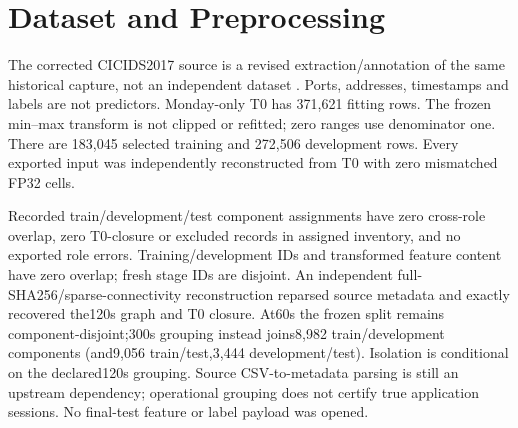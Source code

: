 \documentclass[10pt,a4paper]{article}
\begin{document}
\section{Dataset and Preprocessing}
The corrected CICIDS2017 source is a revised extraction/annotation of the same historical capture, not an independent dataset \cite{liu}. Ports, addresses, timestamps and labels are not predictors. Monday-only T0 has 371,621 fitting rows. The frozen min--max transform is not clipped or refitted; zero ranges use denominator one. There are 183,045 selected training and 272,506 development rows. Every exported input was independently reconstructed from T0 with zero mismatched FP32 cells.

Recorded train/development/test component assignments have zero cross-role overlap, zero T0-closure or excluded records in assigned inventory, and no exported role errors. Training/development IDs and transformed feature content have zero overlap; fresh stage IDs are disjoint. An independent full-SHA256/sparse-connectivity reconstruction reparsed source metadata and exactly recovered the120s graph and T0 closure. At60s the frozen split remains component-disjoint;300s grouping instead joins8,982 train/development components (and9,056 train/test,3,444 development/test). Isolation is conditional on the declared120s grouping. Source CSV-to-metadata parsing is still an upstream dependency; operational grouping does not certify true application sessions. No final-test feature or label payload was opened.
\end{document}

